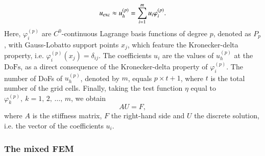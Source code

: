 \documentclass[review,3p]{elsarticle}
\begin{document}
\begin{equation}
 u_{\rm exc} \approx u_h^{(p)} = \sum _ {i=1} ^{m} u _{i} \varphi _{i}^{(p)}. \label{General_SM_u_approx}%
\end{equation}
Here, $\varphi _{i}^{(p)}$ are $C^0$-continuous Lagrange basis functions of degree $p$, denoted as $P_p$, with Gauss-Lobatto support points $x_j$, which feature the Kronecker-delta property, i.e. $\varphi _{i}^{(p)} (x_j)=\delta_{ij}$. The coefficients $u_i$ are the values of $u_h^{(p)}$ at the $\text{DoFs}$, as a direct consequence of the Kronecker-delta property of $\varphi _{i}^{(p)}$. The number of DoFs of $u_h^{(p)}$, denoted by $m$, equals $p \times t + 1$, where $t$ is the total number of the grid cells. 
Finally, taking the test function $\eta$ equal to $\varphi ^{(p)}_{k},~ k=1, \,2, \, \ldots , \, m$, we obtain
\begin{equation}
 A {U} = F,				\label{matrix equation std FEM}
\end{equation}
where $A$ is the stiffness matrix, $F$ the right-hand side and $U$ the discrete solution, i.e. the vector of the coefficients $u_i$.

\subsubsection{The mixed FEM}
\end{document}
